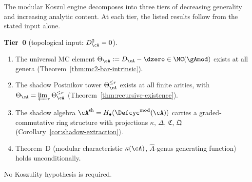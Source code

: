 \begin{theorem}\label{thm:three-tier-architecture}
The modular Koszul engine decomposes into three tiers
of decreasing generality and increasing analytic
content.  At each tier, the listed results follow
from the stated input alone.

\smallskip\noindent
\textbf{Tier~0} \textup{(topological input:
$D_\cA^2 = 0$)}.
\begin{enumerate}[label=\textup{(0.\arabic*)}]
\item The universal MC element
  $\Theta_\cA := D_\cA - \dzero
  \in \MC(\gAmod)$ exists at all genera
  \textup{(Theorem~\ref{thm:mc2-bar-intrinsic})}.
\item The shadow Postnikov tower
  $\Theta_\cA^{\leq r}$ exists at all finite arities,
  with $\Theta_\cA = \varprojlim_r
  \Theta_\cA^{\leq r}$
  \textup{(Theorem~\ref{thm:recursive-existence})}.
\item The shadow algebra
  $\cA^{\mathrm{sh}} =
  H_\bullet(\Defcyc^{\mathrm{mod}}(\cA))$ carries
  a graded-commutative ring structure with
  projections $\kappa$, $\Delta$,
  $\mathfrak{C}$, $\mathfrak{Q}$
  \textup{(Corollary~\ref{cor:shadow-extraction})}.
\item Theorem~D \textup{(}modular characteristic
  $\kappa(\cA)$, $\hat{A}$-genus generating
  function\textup{)} holds unconditionally.
\end{enumerate}
No Koszulity hypothesis is required.


\end{theorem}
